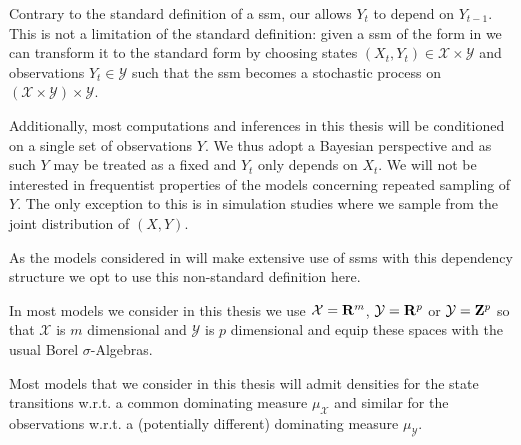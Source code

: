 \begin{remark}
    Contrary to the standard definition of a \gls{ssm}, our  allows $Y_t$ to depend on $Y_{t - 1}$.
    This is not a limitation of the standard definition: given a \gls{ssm} of the form in  we can transform it to the standard form by choosing states $(X_t, Y_t) \in \mathcal X \times \mathcal Y$ and observations $Y_t \in \mathcal Y$ such that the \gls{ssm} becomes a stochastic process on $ \left( \mathcal X \times \mathcal Y\right) \times \mathcal Y$.

    Additionally, most computations and inferences in this thesis will be conditioned on a single set of observations $Y$. We thus adopt a Bayesian perspective and as such $Y$ may be treated as a fixed and $Y_{t}$ only depends on $X_{t}$. We will not be interested in frequentist properties of the models concerning repeated sampling of $Y$. The only exception to this is in simulation studies where we sample from the joint distribution of $(X, Y)$. 

    As the models considered in  will make extensive use of \glspl{ssm} with this dependency structure we opt to use this non-standard definition here.

    In most models we consider in this thesis we use $\mathcal X = \mathbf R^m$, $\mathcal Y = \mathbf R^p$ or $\mathcal Y = \mathbf Z^p$ so that $\mathcal X$ is $m$ dimensional and $\mathcal Y$ is $p$ dimensional and equip these spaces with the usual Borel $\sigma$-Algebras.
\end{remark}

Most models that we consider in this thesis will admit densities for the state transitions w.r.t. a common dominating measure $\mu_{\mathcal X}$ and similar for the observations w.r.t. a (potentially different) dominating measure $\mu_{\mathcal Y}$. 

